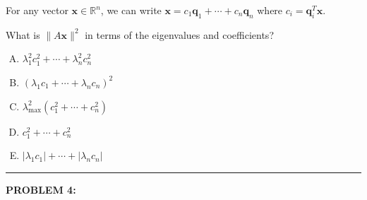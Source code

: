 \documentclass[12pt]{amsart}
\newcommand{\divider}{
  \vspace{-1em} %
  \noindent
  \raisebox{-0.15ex}{\textbullet}%
  \hspace{0.5em}%
  \rule[0.5ex]{0.95\textwidth}{1.0pt}%
  \hspace{0.5em}%
  \raisebox{-0.15ex}{\textbullet}%
  \vspace{0em} %
}
\begin{document}
For any vector $\mathbf{x} \in \mathbb{R}^n$, we can write $\mathbf{x} = c_1\mathbf{q}_1 + \cdots + c_n\mathbf{q}_n$ where $c_i = \mathbf{q}_i^T\mathbf{x}$.

What is $\|A\mathbf{x}\|^2$ in terms of the eigenvalues and coefficients?

\begin{enumerate}[(A)]
\item $\lambda_1^2 c_1^2 + \cdots + \lambda_n^2 c_n^2$
\item $(\lambda_1 c_1 + \cdots + \lambda_n c_n)^2$
\item $\lambda_{\max}^2(c_1^2 + \cdots + c_n^2)$
\item $c_1^2 + \cdots + c_n^2$
\item $|\lambda_1 c_1| + \cdots + |\lambda_n c_n|$
\end{enumerate}


\divider
\newpage


{\bf PROBLEM 4:}
\end{document}
